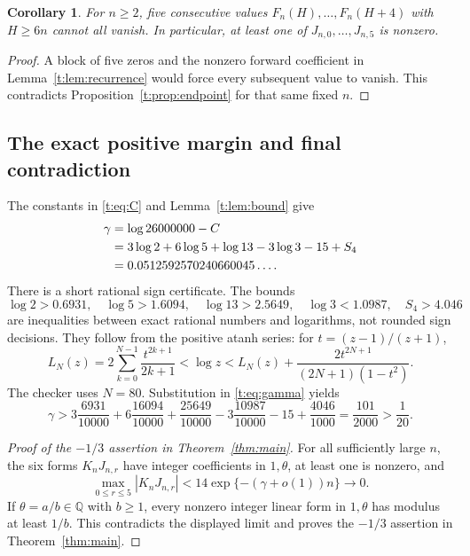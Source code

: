 \documentclass[11pt]{amsart}
\newcommand{\Q}{\mathbb Q}
\theoremstyle{plain}
\newtheorem*{corollary*}{Corollary}
\theoremstyle{remark}\newtheorem{remark}[theorem]{Remark}
\numberwithin{equation}{section}
\begin{document}
\begin{corollary*}
For $n\ge2$, five consecutive values $F_n(H),\ldots,F_n(H+4)$ with
$H\ge6n$ cannot all vanish. In particular, at least one of
$J_{n,0},\ldots,J_{n,5}$ is nonzero.
\end{corollary*}
\begin{proof}
A block of five zeros and the nonzero forward coefficient in
Lemma~\ref{t:lem:recurrence} would force every subsequent value to vanish.
This contradicts Proposition~\ref{t:prop:endpoint} for that same fixed $n$.
\end{proof}

\subsection{The exact positive margin and final contradiction}
The constants in \eqref{t:eq:C} and Lemma~\ref{t:lem:bound} give
\begin{align}
 \gamma&=\log26000000-C\notag\\
 &=3\log2+6\log5+\log13-3\log3-15+S_4\label{t:eq:gamma}\\
 &=0.0512592570240660045\ldots.\notag
\end{align}
There is a short rational sign certificate. The bounds
\[
 \log2>0.6931,\quad\log5>1.6094,\quad\log13>2.5649,
 \quad\log3<1.0987,\quad S_4>4.046
\]
are inequalities between exact rational numbers and logarithms, not rounded
sign decisions. They follow from the positive atanh series: for
$t=(z-1)/(z+1)$,
\[
 L_N(z)=2\sum_{k=0}^{N-1}\frac{t^{2k+1}}{2k+1}
 <\log z< L_N(z)+\frac{2t^{2N+1}}{(2N+1)(1-t^2)}.
\]
The checker uses $N=80$. Substitution in \eqref{t:eq:gamma} yields
\begin{equation}\label{t:eq:gamma-rational}
 \gamma>
 3\frac{6931}{10000}+6\frac{16094}{10000}
 +\frac{25649}{10000}-3\frac{10987}{10000}-15+
 \frac{4046}{1000}
 =\frac{101}{2000}>\frac1{20}.
\end{equation}

\begin{proof}[Proof of the $-1/3$ assertion in Theorem~\ref{thm:main}]
For all sufficiently large $n$, the six forms $K_nJ_{n,r}$ have integer
coefficients in $1,\theta$, at least one is nonzero, and
\[
 \max_{0\le r\le5}|K_nJ_{n,r}|
 <14\exp\{-(\gamma+o(1))n\}\longrightarrow0.
\]
If $\theta=a/b\in\Q$ with $b\ge1$, every nonzero integer linear form in
$1,\theta$ has modulus at least $1/b$. This contradicts the displayed
limit and proves the $-1/3$ assertion in Theorem~\ref{thm:main}.
\end{proof}
\end{document}
